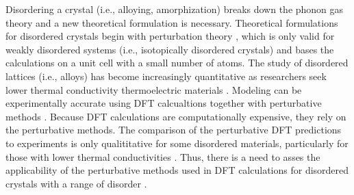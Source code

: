 Disordering a crystal (i.e., alloying, 
amorphization) 
breaks down the phonon gas theory and a new theoretical formulation 
is necessary. Theoretical formulations for disordered crystals begin  
with perturbation theory 
\cite{klemens_scattering_1955,abeles_lattice_1963,
wallace_thermodynamics_1972,maradudin_dynamical_1974,
tamura_isotope_1983}, 
which is only valid for weakly disordered 
systems (i.e., isotopically disordered crystals) and bases the 
calculations on a unit cell with a small 
number of atoms. 
The study of disordered lattices (i.e., alloys) has become 
increasingly quantitative as researchers seek lower thermal 
conductivity thermoelectric materials 
\cite{chen_recent_2003,snyder_complex_2008,toberer_phonon_2011,
shiomi_thermal_2011,
zebarjadi_perspectives_2012,tian_phonon_2012,li_thermal_2012}. 
Modeling can be experimentally accurate using 
DFT calcualtions together with perturbative 
methods 
\cite{broido_intrinsic_2007,ward_ab_2009,ward_intrinsic_2010,
garg_role_2011,
li_thermal_2012,lindsay_thermal_2012,lindsay_first-principles_2013}. 
Because DFT calculations are computationally expensive, they rely on 
the perturbative methods. 
The comparison of the perturbative DFT predictions to experiments 
is only qualititative for some disordered materials, particularly 
for those with lower thermal conductivities 
\cite{kundu_role_2011,shiomi_thermal_2011,tian_phonon_2012,
tian_enhancing_2012}. 
Thus, there is a need to asses the 
applicability of the perturbative methods used in DFT calculations 
for disordered crystals with a range of disorder 
\cite{luckyanova_coherent_2012,kundu_role_2011,shiomi_thermal_2011,
tian_phonon_2012,tian_enhancing_2012,luckyanova_coherent_2012}.

